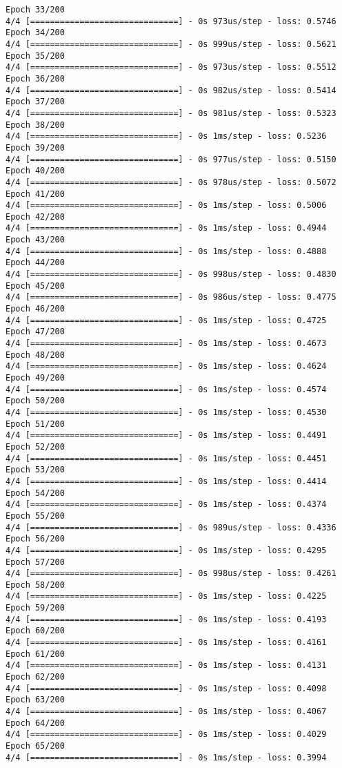 \documentclass[11pt]{article}
\begin{document}
\begin{Verbatim}[commandchars=\\\{\}]
Epoch 33/200
4/4 [==============================] - 0s 973us/step - loss: 0.5746
Epoch 34/200
4/4 [==============================] - 0s 999us/step - loss: 0.5621
Epoch 35/200
4/4 [==============================] - 0s 973us/step - loss: 0.5512
Epoch 36/200
4/4 [==============================] - 0s 982us/step - loss: 0.5414
Epoch 37/200
4/4 [==============================] - 0s 981us/step - loss: 0.5323
Epoch 38/200
4/4 [==============================] - 0s 1ms/step - loss: 0.5236
Epoch 39/200
4/4 [==============================] - 0s 977us/step - loss: 0.5150
Epoch 40/200
4/4 [==============================] - 0s 978us/step - loss: 0.5072
Epoch 41/200
4/4 [==============================] - 0s 1ms/step - loss: 0.5006
Epoch 42/200
4/4 [==============================] - 0s 1ms/step - loss: 0.4944
Epoch 43/200
4/4 [==============================] - 0s 1ms/step - loss: 0.4888
Epoch 44/200
4/4 [==============================] - 0s 998us/step - loss: 0.4830
Epoch 45/200
4/4 [==============================] - 0s 986us/step - loss: 0.4775
Epoch 46/200
4/4 [==============================] - 0s 1ms/step - loss: 0.4725
Epoch 47/200
4/4 [==============================] - 0s 1ms/step - loss: 0.4673
Epoch 48/200
4/4 [==============================] - 0s 1ms/step - loss: 0.4624
Epoch 49/200
4/4 [==============================] - 0s 1ms/step - loss: 0.4574
Epoch 50/200
4/4 [==============================] - 0s 1ms/step - loss: 0.4530
Epoch 51/200
4/4 [==============================] - 0s 1ms/step - loss: 0.4491
Epoch 52/200
4/4 [==============================] - 0s 1ms/step - loss: 0.4451
Epoch 53/200
4/4 [==============================] - 0s 1ms/step - loss: 0.4414
Epoch 54/200
4/4 [==============================] - 0s 1ms/step - loss: 0.4374
Epoch 55/200
4/4 [==============================] - 0s 989us/step - loss: 0.4336
Epoch 56/200
4/4 [==============================] - 0s 1ms/step - loss: 0.4295
Epoch 57/200
4/4 [==============================] - 0s 998us/step - loss: 0.4261
Epoch 58/200
4/4 [==============================] - 0s 1ms/step - loss: 0.4225
Epoch 59/200
4/4 [==============================] - 0s 1ms/step - loss: 0.4193
Epoch 60/200
4/4 [==============================] - 0s 1ms/step - loss: 0.4161
Epoch 61/200
4/4 [==============================] - 0s 1ms/step - loss: 0.4131
Epoch 62/200
4/4 [==============================] - 0s 1ms/step - loss: 0.4098
Epoch 63/200
4/4 [==============================] - 0s 1ms/step - loss: 0.4067
Epoch 64/200
4/4 [==============================] - 0s 1ms/step - loss: 0.4029
Epoch 65/200
4/4 [==============================] - 0s 1ms/step - loss: 0.3994

\end{Verbatim}
\end{document}
